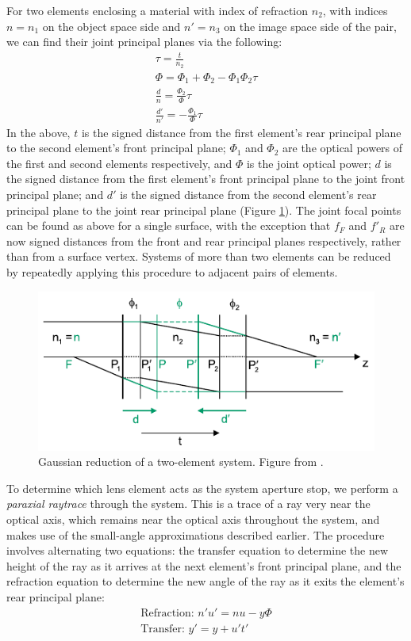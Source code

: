 \documentclass[twocolumn]{article}
\begin{document}
For two elements enclosing a material with index of refraction $n_2$, with indices
$n = n_1$ on the object space side and $n' = n_3$ on the image space side of the pair,
we can find their joint principal planes via the following:
\begin{gather*}
    \tau = \frac{t}{n_2} \\
    \Phi = \Phi_1 + \Phi_2 - \Phi_1\Phi_2\tau \\
    \frac{d}{n} = \frac{\Phi_2}{\Phi}\tau \\
    \frac{d'}{n'} = -\frac{\Phi_1}{\Phi}\tau
\end{gather*}
In the above, $t$ is the signed distance from the first element's rear principal
plane to the second element's front principal plane; $\Phi_1$ and $\Phi_2$ are the
optical powers of the first and second elements respectively, and $\Phi$ is the
joint optical power; $d$ is the signed distance from the first element's front
principal plane to the joint front principal plane; and $d'$ is the signed distance
from the second element's rear principal plane to the joint rear principal plane
(Figure \ref{fig:gaussian_reduction}).
The joint focal points can be found as above for a single surface, with the exception
that $f_F$ and $f'_R$ are now signed distances from the front and rear principal planes
respectively, rather than from a surface vertex. Systems of more than two elements
can be reduced by repeatedly applying this procedure to adjacent pairs of elements.

\begin{figure}[ht]
    \centering
    \includegraphics[width=.45\textwidth]{img/gaussian_reduction.png}
    \caption{Gaussian reduction of a two-element system. Figure from
    \cite{Greivenkamp2004}.}
    \label{fig:gaussian_reduction}
\end{figure}

To determine which lens element acts as the system aperture stop, we perform a
\emph{paraxial raytrace} through the system. This is a trace of a ray very near the
optical axis, which remains near the optical axis throughout the system, and
makes use of the small-angle approximations described earlier. The procedure
involves alternating two equations: the transfer equation to determine the
new height of the ray as it arrives at the next element's front principal plane,
and the refraction equation to determine the new angle of the ray as it exits
the element's rear principal plane:
\begin{gather*}
    \text{Refraction: } n'u' = nu - y\Phi \\
    \text{Transfer: } y' = y + u't'
\end{gather*}
\end{document}

